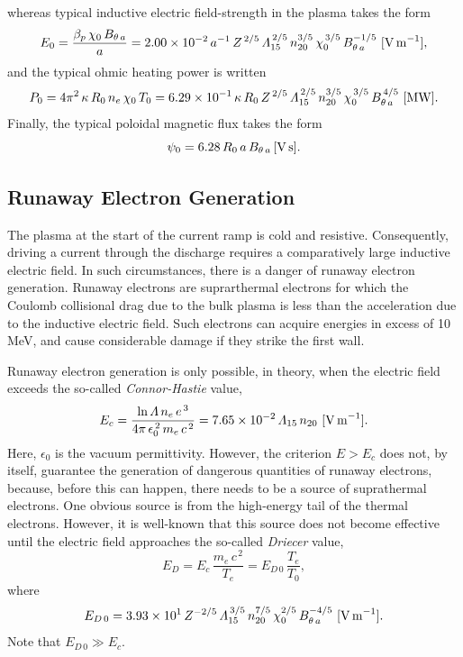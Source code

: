 \documentclass[12pt,prb,aps]{revtex4-1}
\begin{document}
 whereas typical inductive electric field-strength in the plasma takes the form
 \begin{equation}
 E_0 =\frac{\beta_p\,\chi_0\,B_{\theta\,a}}{a} = 2.00\times 10^{-2}\,a^{-1}\,Z^{\,2/5}\,{\mit\Lambda}_{15}^{\,2/5}\,n_{20}^{3/5}\,\chi_0^{\,3/5}\,B_{\theta\,a}^{-1/5}\,\,[{\rm V\,m}^{-1}],
 \end{equation}
 and the typical ohmic heating power is written
 \begin{equation}
 P_0 = 4\pi^2\,\kappa\,R_0\,n_e\,\chi_0\,T_0 = 6.29\times 10^{-1}\,\kappa\,R_0\,Z^{\,2/5}\,{\mit\Lambda}_{15}^{\,2/5}\,n_{20}^{3/5}\,\chi_0^{\,3/5}\,B_{\theta\,a}^{\,4/5}\,\,[{\rm MW}].
 \end{equation}
 Finally, the typical poloidal magnetic flux takes the form 
 \begin{equation}
 \psi_0= 6.28\,R_0\,a\,B_{\theta\,a}\,[{\rm V\,s}].
 \end{equation}
 
\subsection{Runaway Electron Generation}
 The plasma at the start of the current ramp is cold and resistive. Consequently, driving a current through the discharge requires a comparatively large inductive electric field. In such 
 circumstances, there is a danger of runaway electron generation. Runaway electrons are suprarthermal electrons for which the Coulomb collisional drag due to the bulk plasma is
 less than the acceleration due to the inductive electric field. Such electrons can acquire energies in excess of 10 MeV, and  cause considerable damage if they strike the 
 first wall. 
 
 Runaway electron generation is only possible, in theory,  when the electric field exceeds the so-called {\em Connor-Hastie}\/ value,\cite{connor}
 \begin{equation}
 E_c = \frac{\ln{\mit\Lambda}\,n_e\,e^{\,3}}{4\pi\,\epsilon_0^{\,2}\,m_e\,c^{\,2}} = 7.65\times 10^{-2}\,{\mit\Lambda}_{15}\,n_{20}\,\,[{\rm V\,m}^{-1}].
 \end{equation}
 Here, $\epsilon_0$ is the vacuum permittivity. 
 However, the criterion $E>E_c$ does not,  by itself, guarantee the generation of dangerous quantities of runaway electrons, because, before this
 can happen, there needs to be a source of suprathermal electrons. One obvious source is from the high-energy tail of the thermal electrons. However,
 it is well-known that this source does not become effective until the electric field approaches the so-called {\em Driecer}\/ value,\cite{dreicer}
 \begin{equation}
 E_D = E_c\,\frac{m_e\,c^{\,2}}{T_e}= E_{D\,0}\,\frac{T_e}{T_0},
 \end{equation}
 where
 \begin{equation}
 E_{D\,0} = 3.93\times 10^{1}\,Z^{-2/5}\,{\mit\Lambda}_{15}^{\,3/5}\,n_{20}^{7/5}\,\chi_0^{2/5}\,B_{\theta\,a}^{-4/5}\,\,[{\rm V\,m}^{-1}].
 \end{equation}
 Note that $E_{D\,0}\gg E_c$. 
 
\end{document}
